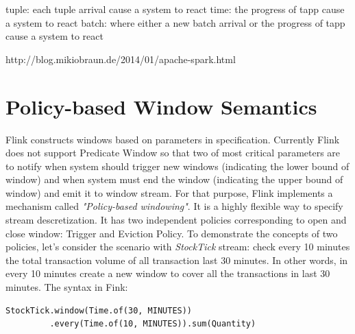 tuple: each tuple arrival cause a system to react
time: the progress of tapp cause a system to react
batch:  where either a new batch arrival or the progress of tapp cause a system to react


http://blog.mikiobraun.de/2014/01/apache-spark.html


\section{Policy-based Window Semantics}


Flink constructs windows based on parameters in specification. Currently Flink does not support Predicate Window so that two of most critical parameters are to notify when system should trigger new windows (indicating the lower bound of window) and when system must end the window (indicating the upper bound of window) and emit it to window stream. For that purpose, Flink implements a mechanism called \textit{"Policy-based windowing"}. It is a highly flexible way to specify stream descretization. It has two independent policies corresponding to open and close window: Trigger and Eviction Policy.
To demonstrate the concepts of two policies, let's consider the scenario with \textit{StockTick} stream: check every 10 minutes the total transaction volume of all transaction last 30 minutes. In other words, in every 10 minutes create a new window to cover all the transactions in last 30 minutes. The syntax in Fink:

\begin{verbatim}
StockTick.window(Time.of(30, MINUTES))
		 .every(Time.of(10, MINUTES)).sum(Quantity)
\end{verbatim}

